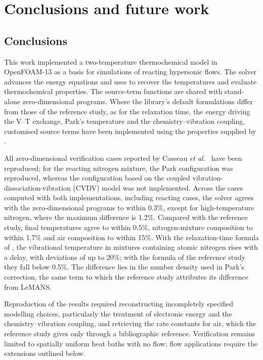 \section{Conclusions and future work}
\label{sec:conclusioni}

\subsection{Conclusions}
\label{sec:conclusioni-sintesi}

This work implemented a two-temperature thermochemical model in OpenFOAM-13
as a basis for simulations of reacting hypersonic flows. The solver advances
the energy equations and uses \mpp{} to recover the temperatures and evaluate
thermochemical properties. The source-term functions are shared with
stand-alone zero-dimensional programs. Where the library's default
formulations differ from those of the reference study, as for the relaxation
time, the energy driving the V--T exchange, Park's temperature and the
chemistry--vibration coupling, customised source terms have been implemented
using the properties supplied by \mpp.

All zero-dimensional verification cases reported by Casseau
\textit{et al.}~\cite{casseau2016} have been reproduced; for the reacting
nitrogen mixture, the Park configuration was reproduced, whereas the
configuration based on the coupled vibration-dissociation-vibration (CVDV)
model was not implemented. Across the cases
computed with both implementations, including reacting cases, the solver
agrees with the zero-dimensional programs to within 0.3\%, except for
high-temperature nitrogen, where the maximum difference is 1.2\%.
Compared with the reference study, final temperatures agree to within 0.5\%,
nitrogen-mixture composition to within 1.7\% and air composition to within
15\%. With the relaxation-time formula of \mpp{}, the vibrational temperature
in mixtures containing atomic nitrogen rises with a delay, with deviations of
up to 20\%; with the formula of the reference study they fall below 0.5\%.
The difference lies in the number density used in Park's correction, the
same term to which the reference study attributes its difference from
LeMANS.

Reproduction of the results required reconstructing incompletely specified
modelling choices, particularly the treatment of electronic energy and the
chemistry--vibration coupling, and retrieving the rate constants for air,
which the reference study gives only through a bibliographic reference.
Verification remains limited to spatially
uniform heat baths with no flow; flow applications require the extensions
outlined below.

